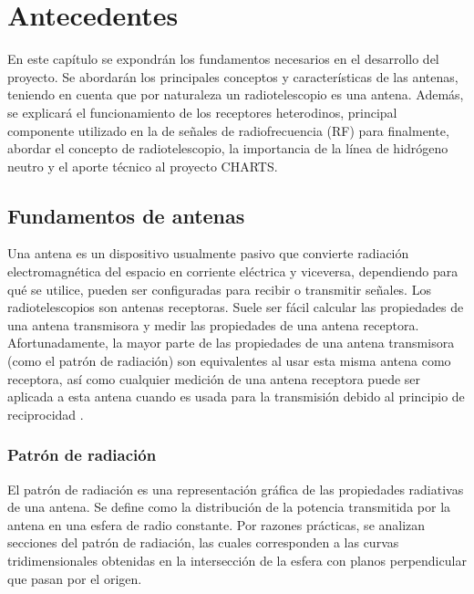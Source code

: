 \chapter{Antecedentes}

En este capítulo se expondrán los fundamentos necesarios en el desarrollo del proyecto. Se abordarán los principales conceptos y características de las antenas, teniendo en cuenta que por naturaleza un radiotelescopio es una antena. Además, se explicará el funcionamiento de los receptores heterodinos, principal componente utilizado en la de señales de radiofrecuencia (RF) para finalmente, abordar el concepto de radiotelescopio, la importancia de la línea de hidrógeno neutro y el aporte técnico al proyecto CHARTS.\\

\section{Fundamentos de antenas}

Una antena es un dispositivo usualmente pasivo que convierte radiación electromagnética del espacio en corriente eléctrica y viceversa, dependiendo para qué se utilice, pueden ser configuradas para recibir o transmitir señales. Los radiotelescopios son antenas receptoras. Suele ser fácil calcular las propiedades de una antena transmisora y medir las propiedades de una antena receptora. Afortunadamente, la mayor parte de las propiedades de una antena transmisora (como el patrón de radiación) son equivalentes al usar esta misma antena como receptora, así como cualquier medición de una antena receptora puede ser aplicada a esta antena cuando es usada para la transmisión debido al principio de reciprocidad \cite{Ransom2016}.\\

\subsection{Patrón de radiación}

El patrón de radiación es una representación gráfica de las propiedades radiativas de una antena. Se define como la distribución de la potencia transmitida por la antena en una esfera de radio constante. Por razones prácticas, se analizan secciones del patrón de radiación, las cuales corresponden a las curvas tridimensionales obtenidas en la intersección de la esfera con planos perpendicular que pasan por el origen.\\

